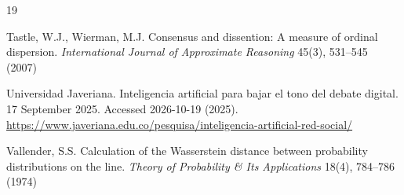 \documentclass{article}
\theoremstyle{plain}
\theoremstyle{remark}
\begin{document}
\begin{thebibliography}{19}

Tastle, W.J.,
Wierman, M.J.
Consensus and dissention: A measure of ordinal dispersion.
\emph{International Journal of Approximate Reasoning}
45(3),
531--545
(2007)


{Universidad Javeriana}.
Inteligencia artificial para bajar el tono del debate digital.
17 September 2025. Accessed 2026-10-19
(2025).
\url{https://www.javeriana.edu.co/pesquisa/inteligencia-artificial-red-social/}


Vallender, S.S.
Calculation of the Wasserstein distance between probability distributions on the line.
\emph{Theory of Probability \& Its Applications}
18(4),
784--786
(1974)

\end{thebibliography}
\end{document}

